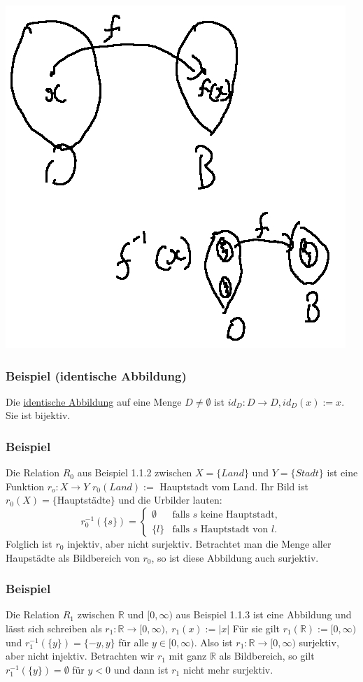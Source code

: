 \begin{center}
\includegraphics[scale=0.4]{1-2-2.jpg}
\end{center}
\subsubsection{Beispiel (identische Abbildung)}
Die \underline{identische Abbildung} auf eine Menge $D\not = \emptyset$ ist $id_D:D\rightarrow D,id_D(x):=x$. Sie ist bijektiv.
\subsubsection*{Beispiel}
Die Relation $R_0$ aus Beispiel 1.1.2 zwischen $X=\{Land\}$ und $Y=\{Stadt\}$ ist eine Funktion $r_o :X\rightarrow Y$ $r_0(Land):=$ Hauptstadt vom Land.  Ihr Bild ist $r_0(X)=\{$Hauptst\"{a}dte$\}$ und die Urbilder lauten:
\[r_0^{-1}(\{s\}) = \begin{cases}
\emptyset & \text{falls $s$ keine Hauptstadt},\\
\{l\}& \text{falls $s$ Hauptstadt von $l$}.
\end{cases}\]
Folglich ist $r_0$ injektiv, aber nicht surjektiv.  Betrachtet man die Menge aller Haupst\"{a}dte als Bildbereich von $r_0$, so ist diese Abbildung auch surjektiv.
\subsubsection{Beispiel}
Die Relation $R_1$ zwischen $\mathbb{R}$ und $[0,\infty )$ aus Beispiel 1.1.3 ist eine Abbildung und lässt sich schreiben als $r_1:\mathbb{R}\rightarrow [0,\infty ),\ r_1(x):=\left|x\right|$
F\"{u}r sie gilt $r_1(\mathbb{R}):=[0,\infty )$ und $r_1^{-1}(\{y\})=\{-y,y\}$ f\"{u}r alle $y\in [0,\infty )$.  Also ist $r_1:\mathbb{R}\rightarrow [0,\infty )$ surjektiv, aber nicht injektiv.  Betrachten wir $r_1$ mit ganz $\mathbb{R}$ als Bildbereich, so gilt $r_1^{-1}(\{y\})=\emptyset$ f\"{u}r $y<0$ und dann ist $r_1$ nicht mehr surjektiv.
